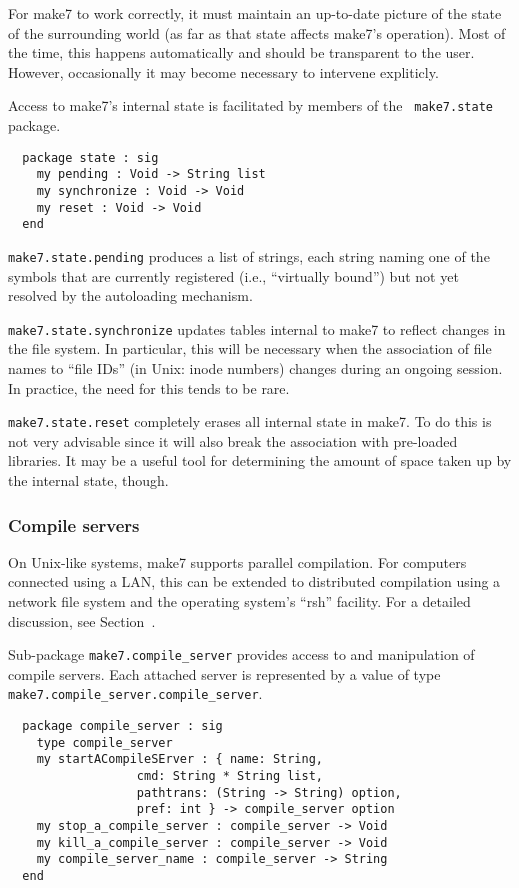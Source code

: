 For make7 to work correctly, it must maintain an up-to-date picture of
the state of the surrounding world (as far as that state affects make7's
operation).  Most of the time, this happens automatically and should be
transparent to the user.  However, occasionally it may become
necessary to intervene expliticly.

Access to make7's internal state is facilitated by members of the {\tt
make7.state} package.

\begin{verbatim}
  package state : sig
    my pending : Void -> String list
    my synchronize : Void -> Void
    my reset : Void -> Void
  end
\end{verbatim}

{\tt make7.state.pending} produces a list of strings, each string naming
one of the symbols that are currently registered (i.e., ``virtually
bound'') but not yet resolved by the autoloading mechanism.

{\tt make7.state.synchronize} updates tables internal to make7 to reflect
changes in the file system.  In particular, this will be necessary
when the association of file names to ``file IDs'' (in Unix: inode
numbers) changes during an ongoing session.  In practice, the need for
this tends to be rare.

{\tt make7.state.reset} completely erases all internal state in make7.  To
do this is not very advisable since it will also break the association
with pre-loaded libraries.  It may be a useful tool for determining
the amount of space taken up by the internal state, though.

\subsubsection{Compile servers}

On Unix-like systems, make7 supports parallel compilation.  For computers
connected using a LAN, this can be extended to distributed compilation
using a network file system and the operating system's ``rsh''
facility.  For a detailed discussion, see Section~.

Sub-package {\tt make7.compile_server} provides access to and manipulation
of compile servers.  Each attached server is represented by a value of
type {\tt make7.compile_server.compile_server}.

\begin{verbatim}
  package compile_server : sig
    type compile_server
    my startACompileSErver : { name: String,
                  cmd: String * String list,
                  pathtrans: (String -> String) option,
                  pref: int } -> compile_server option
    my stop_a_compile_server : compile_server -> Void
    my kill_a_compile_server : compile_server -> Void
    my compile_server_name : compile_server -> String
  end
\end{verbatim}

